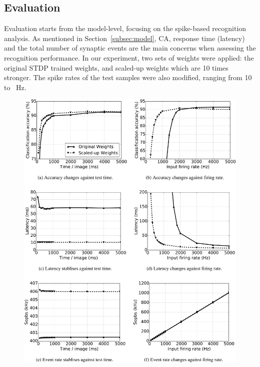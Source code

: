 \subsection{Evaluation}
Evaluation starts from the model-level, focusing on the spike-based recognition analysis.
As mentioned in Section~\ref{subsec:model}, CA, response time (latency) and the total number of synaptic events are the main concerns when assessing the recognition performance.
In our experiment, two sets of weights were applied: the original STDP trained weights, and \DIFaddbegin {}\DIFaddend scaled-up weights which are 10 times stronger.
The spike rates of the test samples were also modified, ranging from 10 to \DIFdelbegin {}\DIFdelend \DIFaddbegin {}\DIFaddend ~Hz.
\begin{figure}[htb!]
	\centering
	\includegraphics[width=1\textwidth]{pics_bench/fig7.jpg}

\end{figure}
